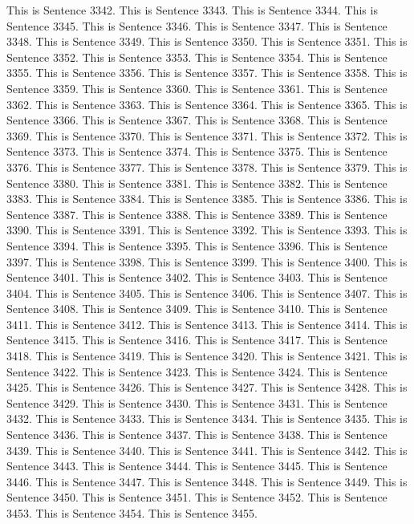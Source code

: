 \documentclass{article}
\begin{document}
This is Sentence 3342.
This is Sentence 3343.
This is Sentence 3344.
This is Sentence 3345.
This is Sentence 3346.
This is Sentence 3347.
This is Sentence 3348.
This is Sentence 3349.
This is Sentence 3350.
This is Sentence 3351.
This is Sentence 3352.
This is Sentence 3353.
This is Sentence 3354.
This is Sentence 3355.
This is Sentence 3356.
This is Sentence 3357.
This is Sentence 3358.
This is Sentence 3359.
This is Sentence 3360.
This is Sentence 3361.
This is Sentence 3362.
This is Sentence 3363.
This is Sentence 3364.
This is Sentence 3365.
This is Sentence 3366.
This is Sentence 3367.
This is Sentence 3368.
This is Sentence 3369.
This is Sentence 3370.
This is Sentence 3371.
This is Sentence 3372.
This is Sentence 3373.
This is Sentence 3374.
This is Sentence 3375.
This is Sentence 3376.
This is Sentence 3377.
This is Sentence 3378.
This is Sentence 3379.
This is Sentence 3380.
This is Sentence 3381.
This is Sentence 3382.
This is Sentence 3383.
This is Sentence 3384.
This is Sentence 3385.
This is Sentence 3386.
This is Sentence 3387.
This is Sentence 3388.
This is Sentence 3389.
This is Sentence 3390.
This is Sentence 3391.
This is Sentence 3392.
This is Sentence 3393.
This is Sentence 3394.
This is Sentence 3395.
This is Sentence 3396.
This is Sentence 3397.
This is Sentence 3398.
This is Sentence 3399.
This is Sentence 3400.
This is Sentence 3401.
This is Sentence 3402.
This is Sentence 3403.
This is Sentence 3404.
This is Sentence 3405.
This is Sentence 3406.
This is Sentence 3407.
This is Sentence 3408.
This is Sentence 3409.
This is Sentence 3410.
This is Sentence 3411.
This is Sentence 3412.
This is Sentence 3413.
This is Sentence 3414.
This is Sentence 3415.
This is Sentence 3416.
This is Sentence 3417.
This is Sentence 3418.
This is Sentence 3419.
This is Sentence 3420.
This is Sentence 3421.
This is Sentence 3422.
This is Sentence 3423.
This is Sentence 3424.
This is Sentence 3425.
This is Sentence 3426.
This is Sentence 3427.
This is Sentence 3428.
This is Sentence 3429.
This is Sentence 3430.
This is Sentence 3431.
This is Sentence 3432.
This is Sentence 3433.
This is Sentence 3434.
This is Sentence 3435.
This is Sentence 3436.
This is Sentence 3437.
This is Sentence 3438.
This is Sentence 3439.
This is Sentence 3440.
This is Sentence 3441.
This is Sentence 3442.
This is Sentence 3443.
This is Sentence 3444.
This is Sentence 3445.
This is Sentence 3446.
This is Sentence 3447.
This is Sentence 3448.
This is Sentence 3449.
This is Sentence 3450.
This is Sentence 3451.
This is Sentence 3452.
This is Sentence 3453.
This is Sentence 3454.
This is Sentence 3455.
\end{document}
